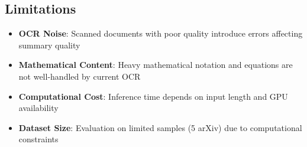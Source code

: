 \subsection{Limitations}

\begin{itemize}
    \item \textbf{OCR Noise}: Scanned documents with poor quality introduce errors affecting summary quality
    \item \textbf{Mathematical Content}: Heavy mathematical notation and equations are not well-handled by current OCR
    \item \textbf{Computational Cost}: Inference time depends on input length and GPU availability
    \item \textbf{Dataset Size}: Evaluation on limited samples (5 arXiv) due to computational constraints
\end{itemize}

